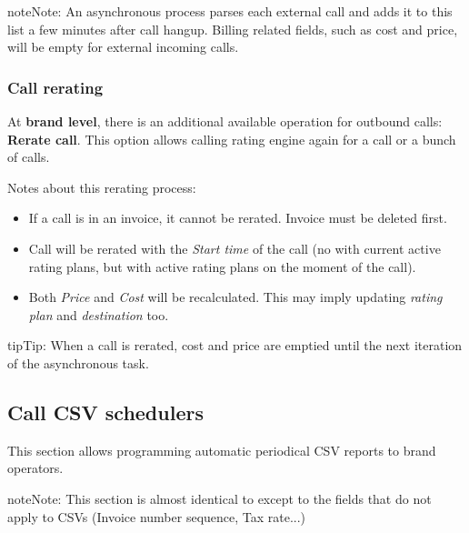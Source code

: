 \documentclass[letterpaper,10pt,english]{sphinxmanual}
\begin{document}
\begin{notice}{note}{Note:}
An asynchronous process parses each external call and adds it to this list a few minutes after call hangup. Billing related fields, such as cost and price, will be empty for external incoming calls.
\end{notice}


\subsubsection{Call rerating}
\label{administration_portal/brand/calls/external_calls:call-rerating}
At \textbf{brand level}, there is an additional available operation for outbound calls: \textbf{Rerate call}. This option allows calling rating engine again for a call or a bunch of calls.

Notes about this rerating process:
\begin{itemize}
\item {} 
If a call is in an invoice, it cannot be rerated. Invoice must be deleted first.

\item {} 
Call will be rerated with the \emph{Start time} of the call (no with current active rating plans, but with active rating plans
on the moment of the call).

\item {} 
Both \emph{Price} and \emph{Cost} will be recalculated. This may imply updating \emph{rating plan} and \emph{destination} too.

\end{itemize}

\begin{notice}{tip}{Tip:}
When a call is rerated, cost and price are emptied until the next iteration of the asynchronous task.
\end{notice}


\subsection{Call CSV schedulers}
\label{administration_portal/brand/calls/call_csv_schedulers:call-csv-schedulers}\label{administration_portal/brand/calls/call_csv_schedulers::doc}
This section allows programming automatic periodical CSV reports to brand operators.

\begin{notice}{note}{Note:}
This section is almost identical to {\hyperref[administration_portal/brand/invoicing/invoice_schedulers:invoice\string-schedulers]{}} except to the
fields that do not apply to CSVs (Invoice number sequence, Tax rate...)
\end{notice}
\end{document}
